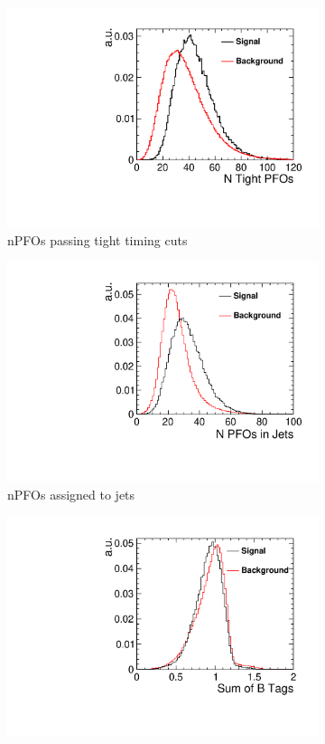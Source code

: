 \begin{figure}[ht]\ContinuedFloat 
  \begin{subfigure}[b]{0.5\linewidth}
    \centering
    \includegraphics[width=0.75\linewidth]{Appendix/figures/NTightPFOs} 
    \caption{nPFOs passing tight timing cuts} 
    \vspace{4ex}
  \end{subfigure}%
  \begin{subfigure}[b]{0.5\linewidth}
    \centering
    \includegraphics[width=0.75\linewidth]{Appendix/figures/PFOsInJets} 
    \caption{nPFOs assigned to jets} 
    \vspace{4ex}
  \end{subfigure} 
  \begin{subfigure}[b]{0.5\linewidth}
    \centering
    \includegraphics[width=0.75\linewidth]{Appendix/figures/SumBTags} 

\end{subfigure}
\end{figure}
